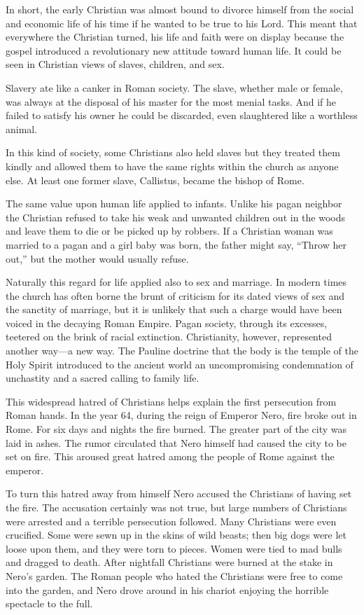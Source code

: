 In short, the early Christian was almost bound to divorce himself from the social and economic life
of his time if he wanted to be true to his Lord. This meant that everywhere the Christian turned,
his life and faith were on display because the gospel introduced a revolutionary new attitude toward
human life. It could be seen in Christian views of slaves, children, and sex.

Slavery ate like a canker in Roman society. The slave, whether male or female, was always at the
disposal of his master for the most menial tasks. And if he failed to satisfy his owner he could be
discarded, even slaughtered like a worthless animal.

In this kind of society, some Christians also held slaves but they treated them kindly and allowed
them to have the same rights within the church as anyone else. At least one former slave, Callistus,
became the bishop of Rome.

The same value upon human life applied to infants. Unlike his pagan neighbor the Christian refused
to take his weak and unwanted children out in the woods and leave them to die or be picked up by
robbers. If a Christian woman was married to a pagan and a girl baby was born, the father might say,
“Throw her out,” but the mother would usually refuse.

Naturally this regard for life applied also to sex and marriage. In modern times the church has
often borne the brunt of criticism for its dated views of sex and the sanctity of marriage, but it
is unlikely that such a charge would have been voiced in the decaying Roman Empire. Pagan society,
through its excesses, teetered on the brink of racial extinction. Christianity, however, represented
another way—a new way. The Pauline doctrine that the body is the temple of the Holy Spirit
introduced to the ancient world an uncompromising condemnation of unchastity and a sacred calling to
family life.

This widespread hatred of Christians helps explain the first persecution from Roman hands. In the
year 64, during the reign of Emperor Nero, fire broke out in Rome. For six days and nights the fire
burned. The greater part of the city was laid in ashes. The rumor circulated that Nero himself had
caused the city to be set on fire. This aroused great hatred among the people of Rome against the
emperor.

To turn this hatred away from himself Nero accused the Christians of having set the fire. The
accusation certainly was not true, but large numbers of Christians were arrested and a terrible
persecution followed. Many Christians were even crucified. Some were sewn up in the skins of wild
beasts; then big dogs were let loose upon them, and they were torn to pieces. Women were tied to mad
bulls and dragged to death. After nightfall Christians were burned at the stake in Nero’s garden.
The Roman people who hated the Christians were free to come into the garden, and Nero drove around
in his chariot enjoying the horrible spectacle to the full.

